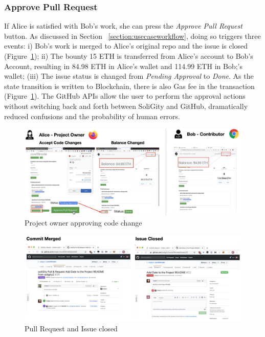 \documentclass[12pt]{article}
\renewcommand{\_}{\kern-1.5pt\textunderscore\kern-1.5pt}
\begin{document}
\subsubsection{Approve Pull Request}

If Alice is satisfied with Bob's work, she can press the \textit{Approve Pull Request} button. As
discussed in Section ~\ref{section:usecaseworkflow}, doing so triggers three events: i) Bob's work is
merged to Alice's original repo and the issue is closed (Figure~\ref{fig:reward2}); ii) The bounty 15
ETH is transferred from Alice's account to Bob's Account, resulting in 84.98 ETH in Alice's wallet and
114.99 ETH in Bob;'s wallet; (iii) The issue status is changed from \textit{Pending Approval} to
\textit{Done}. As the state transition is written to Blockchain, there is also Gas fee in the transaction
(Figure~\ref{fig:reward2}). The GitHub APIs allow the user to perform the approval actions without
switching back and forth between SoliGity and GitHub, dramatically reduced confusions and the probability
of human errors.

\begin{figure}[H]
	\centering
	\includegraphics[width=16cm]{graphs/55. reward_2.png}
	\caption{Project owner approving code change}
	\label{fig:reward2}
\end{figure}

\begin{figure}[H]
	\centering
	\includegraphics[width=16cm]{graphs/56. reward_3.png}
	\caption{Pull Request and Issue closed}
	\label{fig:reward3}
\end{figure}
\end{document}
